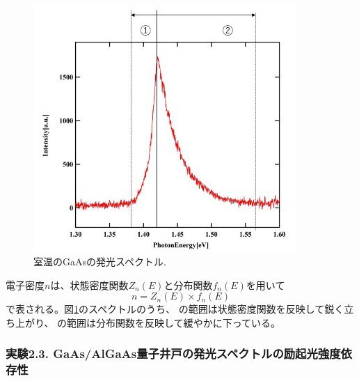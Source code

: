 \documentclass[11pt,a4j]{jsarticle}
\newlength{\circleboxwdht}
\newcommand{\centercircle}[1]{%
  \setlength{\circleboxwdht}{\wd\circlebox}%
  \addtolength{\circleboxwdht}{\dp\circlebox}%
  \raisebox{0.4\dp\circlebox}{%
    \parbox[][\circleboxwdht][c]{\wd\circlebox}{\centering#1}}%
  \llap{\usebox{\circlebox}}%
}	%
\begin{document}
\newpage

\begin{figure}[h]
 \centering
 \includegraphics[clip,width=10cm]{start_lumine.jpg}
 \caption{室温のGaAsの発光スペクトル.}
 \label{fig_lumine1}
\end{figure}

電子密度$n$は、状態密度関数$Z_{n}(E)$と分布関数$f_{n}(E)$を用いて
\begin{equation}
 n=Z_{n}(E)\times f_{n}(E)
 \label{eq_spectrum}
\end{equation}
で表される。図\ref{fig_lumine1}のスペクトルのうち、\centercircle{1}の範囲は状態密度関数を反映して鋭く立ち上がり、\centercircle{2}の範囲は分布関数を反映して緩やかに下っている。

\newpage
\subsubsection{実験2.3. GaAs/AlGaAs量子井戸の発光スペクトルの励起光強度依存性}
\end{document}
